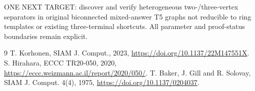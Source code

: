 \documentclass{article}
\begin{document}
ONE NEXT TARGET: discover and verify heterogeneous two-/three-vertex separators in original biconnected mixed-answer T5 graphs not reducible to ring templates or existing three-terminal shortcuts. All parameter and proof-status boundaries remain explicit.
\begin{thebibliography}{9}
 T. Korhonen, SIAM J. Comput., 2023, \url{https://doi.org/10.1137/22M147551X}.
 S. Hirahara, ECCC TR20-050, 2020, \url{https://eccc.weizmann.ac.il/report/2020/050/}.
 T. Baker, J. Gill and R. Solovay, SIAM J. Comput. 4(4), 1975, \url{https://doi.org/10.1137/0204037}.
\end{thebibliography}
\end{document}
